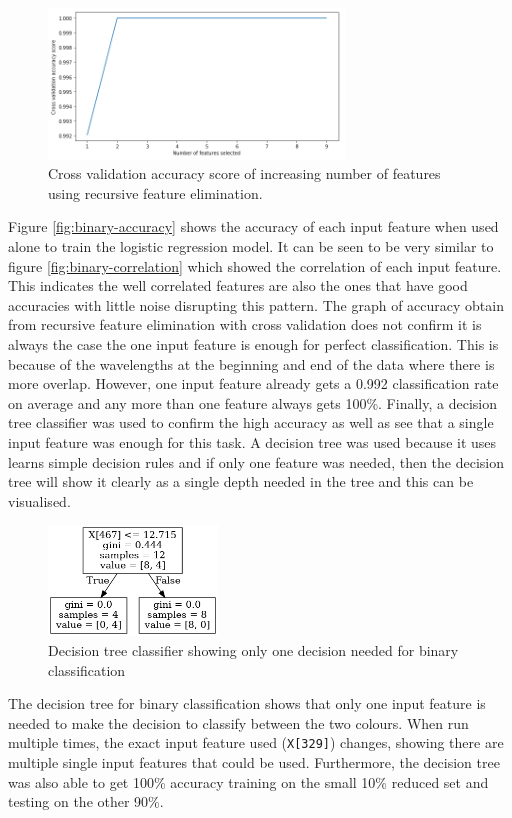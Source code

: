 \documentclass{article}
\begin{document}
\begin{figure}[H]
\centering
\includegraphics[width=0.7\textwidth, keepaspectratio]{imgs/binary-numfeatures.png}
\caption{Cross validation accuracy score of increasing number of features using recursive feature elimination.}
\label{fig:binary-accuracyrfecv}
\end{figure}
\noindent
Figure \ref{fig:binary-accuracy} shows the accuracy of each input feature when used alone to train the logistic regression model. It can be seen to be very similar to figure \ref{fig:binary-correlation} which showed the correlation of each input feature. This indicates the well correlated features are also the ones that have good accuracies with little noise disrupting this pattern. The graph of accuracy obtain from recursive feature elimination with cross validation does not confirm it is always the case the one input feature is enough for perfect classification. This is because of the wavelengths at the beginning and end of the data where there is more overlap. However, one input feature already gets a 0.992 classification rate on average and any more than one feature always gets 100\%. 
\n
Finally, a decision tree classifier was used to confirm the high accuracy as well as see that a single input feature was enough for this task. A decision tree was used because it uses learns simple decision rules and if only one feature was needed, then the decision tree will show it clearly as a single depth needed in the tree and this can be visualised. 
\begin{figure}[H]
\centering
\includegraphics[width=0.4\textwidth, keepaspectratio]{imgs/binary-decisiontree.png}
\caption{Decision tree classifier showing only one decision needed for binary classification}
\end{figure}
\noindent
The decision tree for binary classification shows that only one input feature is needed to make the decision to classify between the two colours. When run multiple times, the exact input feature used (\texttt{X[329]}) changes, showing there are multiple single input features that could be used. Furthermore, the decision tree was also able to get 100\% accuracy training on the small  10\% reduced set and testing on the other 90\%. 
\end{document}

